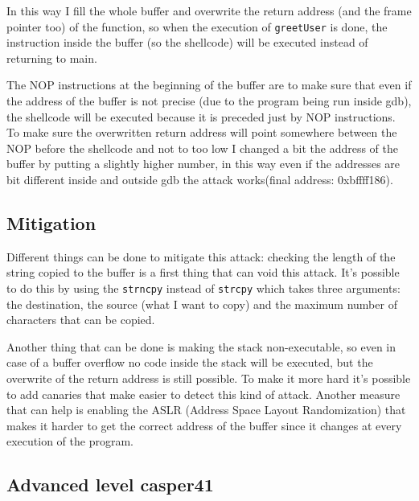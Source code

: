 \documentclass[a4paper,12pt]{article}
\begin{document}

In this way I fill the whole buffer and overwrite the return address (and the frame pointer too) of the function, so when the execution of \texttt{greetUser} is done, the instruction inside the buffer (so the shellcode) will be executed instead of returning to main. 

The NOP instructions at the beginning of the buffer are to make sure that even if the address of the buffer is not precise (due to the program being run inside gdb), the shellcode will be executed because it is preceded just by NOP instructions. To make sure the overwritten return address will point somewhere between the NOP before the shellcode and not to too low I changed a bit the address of the buffer by putting a slightly higher number, in this way even if the addresses are bit different inside and outside gdb the attack works(final address: 0xbffff186).


\subsection{Mitigation}

Different things can be done to mitigate this attack: checking the length of the string copied to the buffer is a first thing that can void this attack. It's possible to do this by using the \texttt{strncpy} instead of \texttt{strcpy} which takes three arguments: the destination, the source (what I want to copy) and the maximum number of characters that can be copied.

Another thing that can be done is making the stack non-executable, so even in case of a buffer overflow no code inside the stack will be executed, but the overwrite of the return address is still possible. To make it more hard it's possible to add canaries that make easier to detect this kind of attack. Another measure that can help is enabling the ASLR (Address Space Layout Randomization) that makes it harder to get the correct address of the buffer since it changes at every execution of the program.

\subsection{Advanced level casper41}
\end{document}

